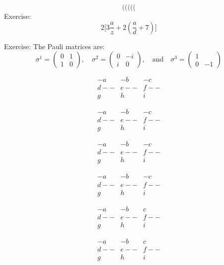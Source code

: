 \documentclass[letterpaper, notitlepage, 12pt]{article}
\begin{document}
\[
( \big( \Big( \bigg( \Bigg(
\]
Exercise:
\[
2 \bigg[3\frac{a}{z}+2 \left(\frac{a}{d}+7\right)\bigg]
\]

Exercise:\break
The Pauli matrices are:
\[
\sigma^1=\begin{pmatrix}
0 & 1 \\
1 & 0
\end{pmatrix}, \quad
\sigma^2=\begin{pmatrix}
0 & -i \\
i & 0
\end{pmatrix}, \quad \text{and} \quad
\sigma^3=\begin{pmatrix}
1 \\
0 & -1
\end{pmatrix}
\]

\[
\begin{array}{ccc} %
-a & -b & -c \\
d-- & e-- & f-- \\
g & h & i
\end{array}
\]

\[
\begin{array}{rrr} %
-a & -b & -c \\
d-- & e-- & f-- \\
g & h & i
\end{array}
\]

\[
\begin{array}{lll} %
-a & -b & -c \\
d-- & e-- & f-- \\
g & h & i
\end{array}
\]

\[
\begin{array}{llr} 
-a & -b & -c \\
d-- & e-- & f-- \\
g & h & i
\end{array}
\]

\[
\begin{array}{r|r||r} 
-a & -b & c \\
d-- & e-- & f-- \\
g & h & i
\end{array}
\]

\[
\begin{array}{r|rr} 
-a & -b & c \\
\hline
d-- & e-- & f-- \\
\hline
g & h & i
\end{array}
\]
\end{document}
